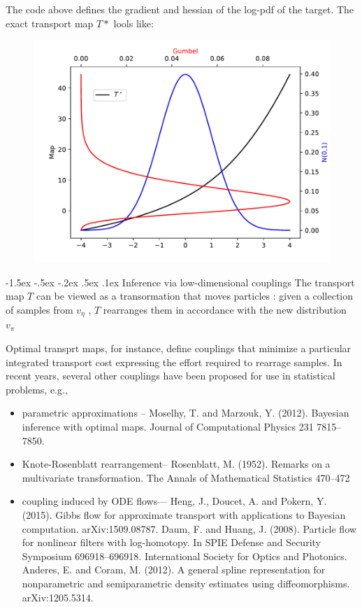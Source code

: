\documentclass[a4paper, 11pt]{article}
\makeatletter
\newcommand{\sihao}{\fontsize{14pt}{\baselineskip}\selectfont}
\renewcommand\section{\@startsection{section}{1}{\z@}%
{-1.5ex \@plus -.5ex \@minus -.2ex}%
{.5ex \@plus .1ex}%
{\normalfont\sihao\CJKfamily{hei}}}
\makeatother
\begin{document}
\begin{CJK}{UTF8}{gbsn}
The code above defines the gradient and hessian of the log-pdf of the target.
The exact transport map $T*$ lools like:
\begin{figure}[!htp]
\centering
\includegraphics[scale=0.8]{src/figs/GumbelTransportMap.pdf}
\end{figure}


\section{Inference via low-dimensional couplings}
The transport map $T$ can be viewed as a transormation that moves particles : given a collection of samples from $v_{\eta}$ , $T$ rearranges them in accordance with the new distribution $v_{\pi}$

Optimal transprt maps, for instance, define couplings that minimize a particular integrated transport cost expressing the effort required to rearrage samples. In recent years, several other couplings have been proposed for use in statistical problems, e.g.,

\begin{itemize}
\item parametric approximations -- Moselhy, T. and Marzouk, Y. (2012). Bayesian inference with optimal maps. Journal of Computational Physics 231 7815–7850.
\item Knote-Rosenblatt rearrangement-- Rosenblatt, M. (1952). Remarks on a multivariate transformation. The Annals of Mathematical Statistics 470–472
\item coupling induced by ODE flows--- Heng, J., Doucet, A. and Pokern, Y. (2015). Gibbs flow for approximate transport with applications to Bayesian computation. arXiv:1509.08787.
Daum, F. and Huang, J. (2008). Particle flow for nonlinear filters with log-homotopy. In SPIE Defense and Security Symposium 696918–696918. International Society for Optics and Photonics.
Anderes, E. and Coram, M. (2012). A general spline representation for nonparametric and semiparametric density estimates using diffeomorphisms. arXiv:1205.5314.
\end{itemize}


\end{CJK}
\end{document}
